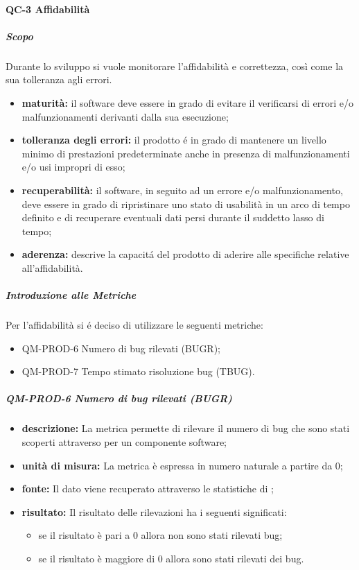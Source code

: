 		\paragraph{QC-3 Affidabilità}
			\subparagraph{Scopo}
				Durante lo sviluppo si vuole monitorare l'affidabilità e correttezza, così come la sua tolleranza agli errori.
				\begin{itemize}
					\item \textbf{maturità:} il software deve essere in grado di evitare il verificarsi di errori e/o malfunzionamenti derivanti dalla sua esecuzione;
					\item \textbf{tolleranza degli errori:} il prodotto é in grado di mantenere un livello minimo di prestazioni predeterminate anche in presenza di malfunzionamenti e/o usi impropri di esso;
					\item \textbf{recuperabilità:} il software, in seguito ad un errore e/o malfunzionamento, deve essere in grado di ripristinare uno stato di usabilità in un arco di tempo definito e di recuperare eventuali dati persi durante il suddetto lasso di tempo;
					\item \textbf{aderenza:} descrive la capacitá del prodotto di aderire alle specifiche relative all'affidabilità.
				\end{itemize}
			\subparagraph{Introduzione alle Metriche}
				Per l'affidabilità si é deciso di utilizzare le seguenti metriche:
				\begin{itemize}
					\item QM-PROD-6 Numero di bug rilevati (BUGR);
					\item QM-PROD-7 Tempo stimato risoluzione bug (TBUG).
				\end{itemize}
			\subparagraph{ QM-PROD-6 Numero di bug rilevati (BUGR)}
			\begin{itemize}
      			\item \textbf{descrizione: }
					La metrica permette di rilevare il numero di bug che sono stati scoperti attraverso  per un componente software;
				\item \textbf{unità di misura: }
					La metrica è espressa in numero naturale a partire da 0;
				\item \textbf{fonte: }
					Il dato viene recuperato attraverso le statistiche di ;
				\item \textbf{risultato: }
					Il risultato delle rilevazioni ha i seguenti significati:
					\begin{itemize}
						\item se il risultato è pari a 0 allora non sono stati rilevati bug;
						\item se il risultato è maggiore di 0 allora sono stati rilevati dei bug.
					\end{itemize}
			\end{itemize}
